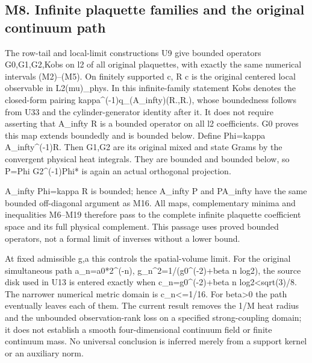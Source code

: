 \documentclass[11pt,a4paper]{article}
\renewcommand{\[}{\begingroup\small\originaldisplaystart}
\renewcommand{\]}{\originaldisplayend\endgroup}
\begin{document}
\subsection{M8. Infinite plaquette families and the original continuum
path}\label{m8.-infinite-plaquette-families-and-the-original-continuum-path}

The row-tail and local-limit constructions U9 give bounded operators
G0,G1,G2,Kobs on l2 of all original plaquettes, with exactly the same
numerical intervals (M2)--(M5). On finitely supported c, R c is the
original centered local observable in L2(mu)\_phys. In this
infinite-family statement Kobs denotes the closed-form pairing
{k\allowbreak{}a\allowbreak{}p\allowbreak{}p\allowbreak{}a\allowbreak{}\textasciicircum{}\allowbreak{}(\allowbreak{}-\allowbreak{}1\allowbreak{})\allowbreak{}q\allowbreak{}\_\allowbreak{}(\allowbreak{}A\allowbreak{}\_\allowbreak{}i\allowbreak{}n\allowbreak{}f\allowbreak{}t\allowbreak{}y\allowbreak{})\allowbreak{}(\allowbreak{}R\allowbreak{}.\allowbreak{},\allowbreak{}R\allowbreak{}.\allowbreak{})\allowbreak{},\allowbreak{}}
whose boundedness follows from U33 and the cylinder-generator identity
after it. It does not require asserting that A\_infty R is a bounded
operator on all l2 coefficients. G0 proves this map extends boundedly
and is bounded below. Define Phi=kappa A\_infty\^{}(-1)R. Then G1,G2 are
its original mixed and state Grams by the convergent physical heat
integrals. They are bounded and bounded below, so P=Phi G2\^{}(-1)Phi*
is again an actual orthogonal projection.

A\_infty Phi=kappa R is bounded; hence A\_infty P and PA\_infty have the
same bounded off-diagonal argument as M16. All maps, complementary
minima and inequalities M6--M19 therefore pass to the complete infinite
plaquette coefficient space and its full physical complement. This
passage uses proved bounded operators, not a formal limit of inverses
without a lower bound.

At fixed admissible g,a this controls the spatial-volume limit. For the
original simultaneous path a\_n=a0*2\^{}(-n),
{g\allowbreak{}\_\allowbreak{}n\allowbreak{}\textasciicircum{}\allowbreak{}2\allowbreak{}=\allowbreak{}1\allowbreak{}/\allowbreak{}(\allowbreak{}g\allowbreak{}0\allowbreak{}\textasciicircum{}\allowbreak{}(\allowbreak{}-\allowbreak{}2\allowbreak{})\allowbreak{}+\allowbreak{}b\allowbreak{}e\allowbreak{}t\allowbreak{}a\allowbreak{}}
n log2), the source disk used in U13 is entered exactly when
c\_n=g0\^{}(-2)+beta n log2\textless sqrt(3)/8. The narrower numerical
metric domain is c\_n\textless=1/16. For beta\textgreater0 the path
eventually leaves each of them. The current result removes the 1/M heat
radius and the unbounded observation-rank loss on a specified
strong-coupling domain; it does not establish a smooth four-dimensional
continuum field or finite continuum mass. No universal conclusion is
inferred merely from a support kernel or an auxiliary norm.
\end{document}

